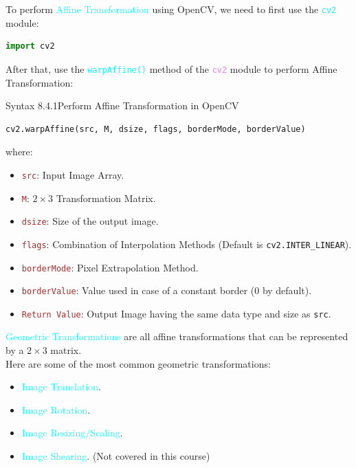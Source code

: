 \documentclass{book}
\begin{document}
To perform \textcolor{cyan}{Affine Transformation} using OpenCV, we need to first use the \textcolor{cyan}{\texttt{cv2}} module:
\begin{lstlisting}[language=Python, basicstyle=\ttfamily\small, keywordstyle=\color{blue}, commentstyle=\color{forestgreen}, stringstyle=\color{red}, showstringspaces=false]
                                            import cv2
\end{lstlisting}
After that, use the \textcolor{cyan}{\texttt{warpAffine()}} method of the \textcolor{violet}{\texttt{cv2}} module to perform Affine Transformation:
\begin{synBox}{Syntax 8.4.1}{Perform Affine Transformation in OpenCV}
    \begin{lstlisting}[language=Python, basicstyle=\ttfamily\small, keywordstyle=\color{blue}, commentstyle=\color{forestgreen}, stringstyle=\color{red}, showstringspaces=false]
                    cv2.warpAffine(src, M, dsize, flags, borderMode, borderValue)
    \end{lstlisting}
    where:
    \begin{itemize}
        \item \textcolor{brown}{\texttt{src}}: Input Image Array.
        \item \textcolor{brown}{\texttt{M}}: $2 \times 3$ Transformation Matrix.
        \item \textcolor{brown}{\texttt{dsize}}: Size of the output image.
        \item \textcolor{brown}{\texttt{flags}}: Combination of Interpolation Methods (Default is \texttt{cv2.INTER\_LINEAR}).
        \item \textcolor{brown}{\texttt{borderMode}}: Pixel Extrapolation Method.
        \item \textcolor{brown}{\texttt{borderValue}}: Value used in case of a constant border (0 by default).
        \item \textcolor{brown}{\texttt{Return Value}}: Output Image having the same data type and size as \texttt{src}.
    \end{itemize}
\end{synBox}
\textcolor{cyan}{Geometric Transformations} are 
all affine transformations that can be represented by a $2 \times 3$ matrix.\\
Here are some of the most common geometric transformations:
\begin{itemize}
    \item \textcolor{cyan}{Image Translation}.
    \item \textcolor{cyan}{Image Rotation}.
    \item \textcolor{cyan}{Image Resizing/Scaling}.
    \item \textcolor{cyan}{Image Shearing}. (Not covered in this course)
\end{itemize}
\end{document}
